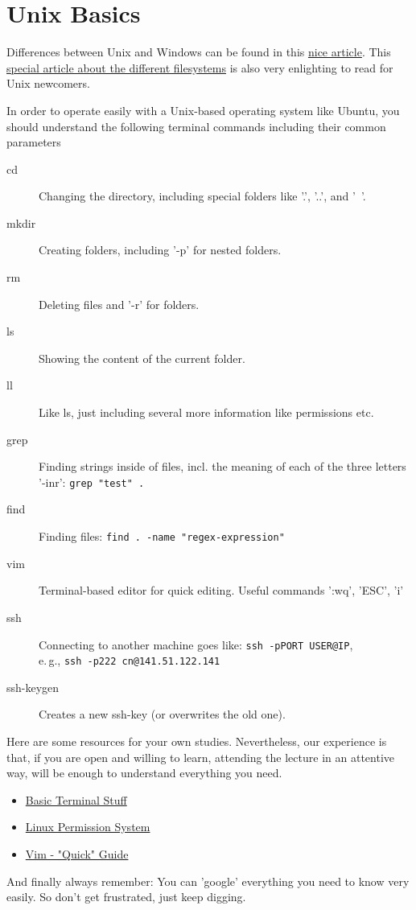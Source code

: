 \section{Unix Basics}
\label{sec:LinuxBasics}

Differences between Unix and Windows can be found in this \href{https://www.techrepublic.com/blog/10-things/10-fundamental-differences-between-linux-and-windows/}{nice article}. This \href{https://www.howtogeek.com/137096/6-ways-the-linux-file-system-is-different-from-the-windows-file-system/}{special article about the different filesystems} is also very enlighting to read for Unix newcomers.

In order to operate easily with a Unix-based operating system like Ubuntu, you should understand the following terminal commands including their common parameters 

\begin{description}
\item [cd] Changing the directory, including special folders like '.', '..', and '~'.
\item [mkdir] Creating folders, including '-p' for nested folders.
\item [rm] Deleting files and '-r' for folders.
\item [ls] Showing the content of the current folder.
\item [ll] Like ls, just including several more information like permissions etc.
\item [grep] Finding strings inside of files, incl. the meaning of each of the three letters '-inr': \verb#grep "test" .# 
\item [find] Finding files: \verb#find . -name "regex-expression"#
\item [vim] Terminal-based editor for quick editing. Useful commands ':wq', 'ESC', 'i'
\item [ssh] Connecting to another machine goes like: \verb#ssh -pPORT USER@IP#,\\e.\,g., \verb#ssh -p222 cn@141.51.122.141#
\item [ssh-keygen] Creates a new ssh-key (or overwrites the old one).
\end{description}

Here are some resources for your own studies. Nevertheless, our experience is that, if you are open and willing to learn, attending the lecture in an attentive way, will be enough to understand everything you need.
\begin{itemize}
\item \href{https://www.digitalocean.com/community/tutorials/an-introduction-to-linux-basics}{Basic Terminal Stuff}
\item \href{https://www.digitalocean.com/community/tutorials/linux-permissions-basics-and-how-to-use-umask-on-a-vps}{Linux Permission System}
\item \href{https://www.tutorialspoint.com/vim/vim_quick_guide.htm}{Vim - "Quick" Guide}
\end{itemize}

And finally always remember: You can 'google' everything you need to know very easily. So don't get frustrated, just keep digging.
